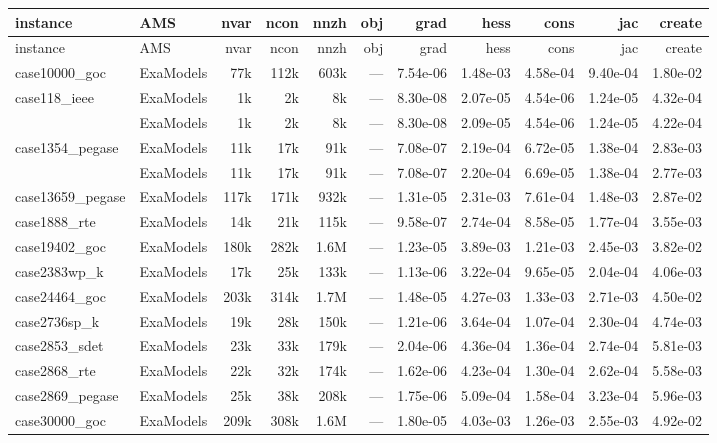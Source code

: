 {\scriptsize
\setlength{\tabcolsep}{4pt}
\begin{longtable}{@{}ll rrr rrr rr r@{}}
  \toprule
  instance & AMS & nvar & ncon & nnzh & obj & grad & hess & cons & jac & create \\
  \midrule
  \endfirsthead
  \toprule
  instance & AMS & nvar & ncon & nnzh & obj & grad & hess & cons & jac & create \\
  \midrule
  \endhead
  case10000\_goc & ExaModels & 77k & 112k & 603k & --- & 7.54e-06 & 1.48e-03 & 4.58e-04 & 9.40e-04 & 1.80e-02 \\
  case118\_ieee & ExaModels & 1k & 2k & 8k & --- & 8.30e-08 & 2.07e-05 & 4.54e-06 & 1.24e-05 & 4.32e-04 \\
   & ExaModels & 1k & 2k & 8k & --- & 8.30e-08 & 2.09e-05 & 4.54e-06 & 1.24e-05 & 4.22e-04 \\
  case1354\_pegase & ExaModels & 11k & 17k & 91k & --- & 7.08e-07 & 2.19e-04 & 6.72e-05 & 1.38e-04 & 2.83e-03 \\
   & ExaModels & 11k & 17k & 91k & --- & 7.08e-07 & 2.20e-04 & 6.69e-05 & 1.38e-04 & 2.77e-03 \\
  case13659\_pegase & ExaModels & 117k & 171k & 932k & --- & 1.31e-05 & 2.31e-03 & 7.61e-04 & 1.48e-03 & 2.87e-02 \\
  case1888\_rte & ExaModels & 14k & 21k & 115k & --- & 9.58e-07 & 2.74e-04 & 8.58e-05 & 1.77e-04 & 3.55e-03 \\
  case19402\_goc & ExaModels & 180k & 282k & 1.6M & --- & 1.23e-05 & 3.89e-03 & 1.21e-03 & 2.45e-03 & 3.82e-02 \\
  case2383wp\_k & ExaModels & 17k & 25k & 133k & --- & 1.13e-06 & 3.22e-04 & 9.65e-05 & 2.04e-04 & 4.06e-03 \\
  case24464\_goc & ExaModels & 203k & 314k & 1.7M & --- & 1.48e-05 & 4.27e-03 & 1.33e-03 & 2.71e-03 & 4.50e-02 \\
  case2736sp\_k & ExaModels & 19k & 28k & 150k & --- & 1.21e-06 & 3.64e-04 & 1.07e-04 & 2.30e-04 & 4.74e-03 \\
  case2853\_sdet & ExaModels & 23k & 33k & 179k & --- & 2.04e-06 & 4.36e-04 & 1.36e-04 & 2.74e-04 & 5.81e-03 \\
  case2868\_rte & ExaModels & 22k & 32k & 174k & --- & 1.62e-06 & 4.23e-04 & 1.30e-04 & 2.62e-04 & 5.58e-03 \\
  case2869\_pegase & ExaModels & 25k & 38k & 208k & --- & 1.75e-06 & 5.09e-04 & 1.58e-04 & 3.23e-04 & 5.96e-03 \\
  case30000\_goc & ExaModels & 209k & 308k & 1.6M & --- & 1.80e-05 & 4.03e-03 & 1.26e-03 & 2.55e-03 & 4.92e-02 \\

\end{longtable}}

